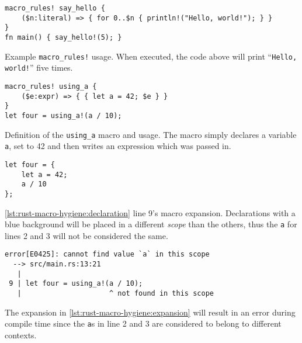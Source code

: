 
\begin{listing}
    \centering
    \begin{verbatim}
macro_rules! say_hello {
    ($n:literal) => { for 0..$n { println!("Hello, world!"); } }
}
fn main() { say_hello!(5); }
    \end{verbatim}
    \caption{Example \texttt{macro\_rules!} usage.
        When executed, the code above will print “\texttt{Hello, world!}” five times.}
    \label{lst:rust-macro-rules}
\end{listing}


\begin{listing}
    \begin{verbatim}
macro_rules! using_a {
    ($e:expr) => { { let a = 42; $e } }
}
let four = using_a!(a / 10);
    \end{verbatim}
    \caption{
        Definition of the \texttt{using\_a} macro and usage.
        The macro simply declares a variable \texttt{a},
        set to 42 and then writes an expression which was passed in.
    }
    \label{lst:rust-macro-hygiene:declaration}
\end{listing}

\begin{listing}
    \begin{verbatim}
let four = {
    let a = 42;
    a / 10
};
    \end{verbatim}
    \caption{
        \autoref{lst:rust-macro-hygiene:declaration} line 9's macro expansion.
        Declarations with a blue background will be placed in a different \emph{scope} than the others,
        thus the \texttt{a} for lines 2 and 3 will not be considered the same.
    }
    \label{lst:rust-macro-hygiene:expansion}
\end{listing}

\begin{listing}
    \begin{verbatim}
error[E0425]: cannot find value `a` in this scope
  --> src/main.rs:13:21
   |
 9 | let four = using_a!(a / 10);
   |                     ^ not found in this scope
    \end{verbatim}
    \caption{
        The expansion in \autoref{lst:rust-macro-hygiene:expansion} will result in an error during compile time
        since the \texttt{a}s in line 2 and 3 are considered to belong to different contexts.
    }
    \label{lst:rust-macro-hygiene:error}
\end{listing}

